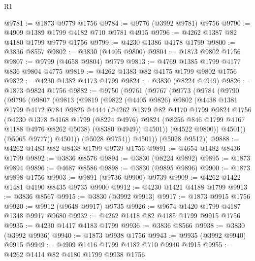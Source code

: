 \begin{lexlean}{R1}
\begin{coremodule}
@9781 := @1873 @9779 @1756
@9784 := @9776 (@3992 @9781) @9756
@9790 := @4909 @1389 @1799 @4182 @710 @9781 @4915
@9796 := @4262 @1387 @82 @4180 @1799 @9779 @1756
@9799 := @4230 @1386 @4178 @1799
@9800 := @3836 @8557
@9802 := @3830 (@4405 @9800)
@9804 := @1873 @9802 @1756
@9807 := @9799 (@4658 @9804) @9779
@9813 := @4769 @1385 @1799 @4177 @836 @9804 @4775
@9819 := @4262 @1383 @82 @4175 @1799 @9802 @1756
@9822 := @4230 @1382 @4173 @1799
@9824 := @3830 (@8224 @4949)
@9826 := @1873 @9824 @1756
@9882 := @9750
    (@9761
      (@9767
        (@9773
          (@9784
            (@9790
              (@9796
                (@9807
                  (@9813
                    (@9819
                      (@9822
                        (@4405 @9826)
                        @9802
                        (@4438
                          @1381
                          @1799
                          @4172
                          @784
                          @9826
                          @4444
                          (@4262
                            @1379
                            @82
                            @4170
                            @1799
                            @9824
                            @1756
                            (@4230
                              @1378
                              @4168
                              @1799
                              (@8224 @4976)
                              @9824
                              (@8256 @846 @1799 @4167 @1188 @4976 @8262 @5038)
                              (@8380 @4949))
                            @4501))
                        (@4522 @9800))
                      @4501))
                  (@5065 @9777))
                @4501))
            (@5028 @9754))
          @4501))
      (@5028 @9512))
@9888 := @4262 @1483 @82 @8438 @1799 @9739 @1756
@9891 := @4654 @1482 @8436 @1799
@9892 := @3836 @8576
@9894 := @3830 (@8224 @9892)
@9895 := @1873 @9894
@9896 := @4687 @8586
@9898 := @3830 (@9895 @9896)
@9900 := @1873 @9898 @1756
@9903 := @9891 (@9736 @9900) @9739
@9909 := @4262 @1422 @1481 @4190 @8435 @9735 @9900
@9912 := @4230 @1421 @4188 @1799
@9913 := @3836 @8567
@9915 := @3830 (@3992 @9913)
@9917 := @1873 @9915 @1756
@9920 := @9912 (@9648 @9917) @9735
@9926 := @9674 @1420 @1799 @4187 @1348 @9917 @9680
@9932 := @4262 @1418 @82 @4185 @1799 @9915 @1756
@9935 := @4230 @1417 @4183 @1799
@9936 := @3836 @8566
@9938 := @3830 (@3992 @9936)
@9940 := @1873 @9938 @1756
@9943 := @9935 (@3992 @9940) @9915
@9949 := @4909 @1416 @1799 @4182 @710 @9940 @4915
@9955 := @4262 @1414 @82 @4180 @1799 @9938 @1756

\end{coremodule}
\end{lexlean}

